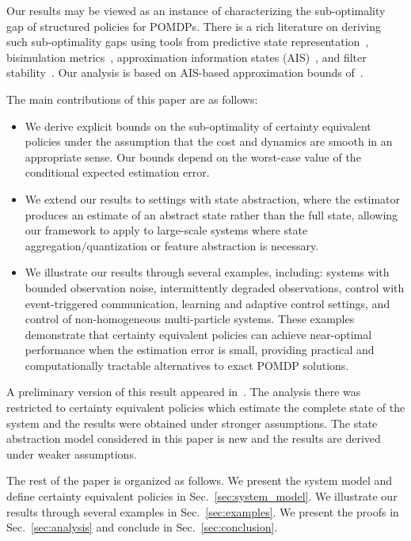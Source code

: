 \documentclass[letterpaper, 10pt]{IEEEtran}
\theoremstyle{plain}
\theoremstyle{nonumberplain}
\theoremstyle{plain}
\begin{document}
Our results may be viewed as an instance of characterizing the sub-optimality gap of structured policies for POMDPs. There is a rich literature on deriving such sub-optimality gaps using tools from predictive state representation~\cite{Wolfe2008,Hamilton2014}, bisimulation metrics~\cite{CastroPanangadenPrecup_2009}, approximation information states (AIS)~\cite{AIS}, and filter stability~\cite{mcdonald2022robustness,kara2022near,golowich}. Our analysis is based on AIS-based approximation bounds of~\cite{AIS}. 

The main contributions of this paper are as follows:
\begin{itemize}
\item  We derive explicit bounds on the sub-optimality of certainty equivalent policies under the assumption that the cost and dynamics are smooth in an appropriate sense. Our bounds depend on the worst-case value of the conditional expected estimation error. 

\item We extend our results to settings with state abstraction, where the estimator produces an estimate of an abstract state rather than the full state, allowing our framework to apply to large-scale systems where state aggregation/quantization or feature abstraction is necessary.

\item  We illustrate our results through several examples, including: systems with bounded observation noise, intermittently degraded observations, control with event-triggered communication, learning and adaptive control settings, and control of non-homogeneous multi-particle systems. These examples demonstrate that certainty equivalent policies can achieve near-optimal performance when the estimation error is small, providing practical and computationally tractable alternatives to exact POMDP solutions.
\end{itemize}

A preliminary version of this result appeared in~\cite{bozkurtgeneralized}. The analysis there was restricted to certainty equivalent policies which estimate the complete state of the system and the results were obtained under stronger assumptions. The state abstraction model considered in this paper is new and the results are derived under weaker assumptions.

The rest of the paper is organized as follows. We  present the system model and define certainty equivalent policies in Sec.~\ref{sec:system_model}. We illustrate our results through several examples in Sec.~\ref{sec:examples}. We present the proofs in Sec.~\ref{sec:analysis} and conclude in Sec.~\ref{sec:conclusion}.
\end{document}
